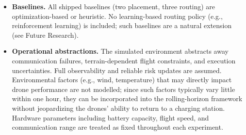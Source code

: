 \documentclass{article}
\begin{document}
\begin{itemize}[leftmargin=*,itemsep=2pt,topsep=2pt]
\item \textbf{Baselines.}
All shipped baselines (two placement, three routing) are optimization-based or heuristic. No learning-based routing policy (e.g., reinforcement learning) is included; such baselines are a natural extension (see Future Research).

\item \textbf{Operational abstractions.}
The simulated environment abstracts away communication failures, terrain-dependent flight constraints, and execution uncertainties. Full observability and reliable risk updates are assumed. Environmental factors (e.g., wind, temperature) that may directly impact drone performance are not modelled; since such factors typically vary little within one hour, they can be incorporated into the rolling-horizon framework without jeopardizing the drones' ability to return to a charging station. Hardware parameters including battery capacity, flight speed, and communication range are treated as fixed throughout each experiment.
\end{itemize}


\end{document}
